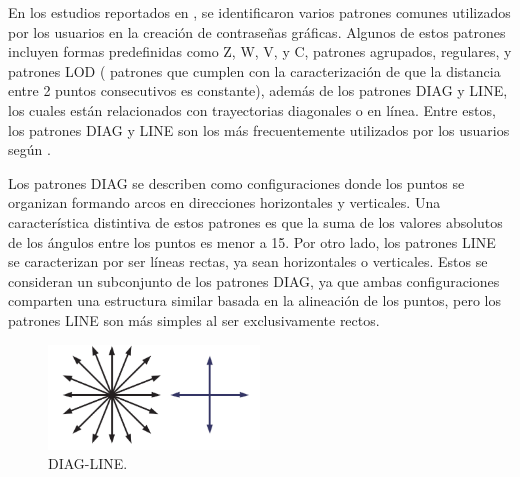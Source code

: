 \documentclass[12pt]{report}
\begin{document}
En los estudios reportados en \cite{5,20,21,22,23,24,25}, se identificaron varios patrones comunes utilizados por los usuarios en la creación de contraseñas gráficas. Algunos de estos patrones incluyen formas predefinidas como Z, W, V, y C, patrones agrupados, regulares, y patrones LOD ( patrones que cumplen con la caracterización de que la distancia entre 2 puntos consecutivos es constante), además de los patrones DIAG y LINE, los cuales están relacionados con trayectorias diagonales o en línea. Entre estos, los patrones DIAG y LINE son los más frecuentemente utilizados por los usuarios según \cite{5}.

Los patrones DIAG se describen como configuraciones donde los puntos se organizan formando arcos en direcciones horizontales y verticales. Una característica distintiva de estos patrones es que la suma de los valores absolutos de los ángulos entre los puntos es menor a 15\degree. Por otro lado, los patrones LINE se caracterizan por ser líneas rectas, ya sean horizontales o verticales. Estos se consideran un subconjunto de los patrones DIAG, ya que ambas configuraciones comparten una estructura similar basada en la alineación de los puntos, pero los patrones LINE son más simples al ser exclusivamente rectos.

\begin{figure}[ht]
	\centering
	\includegraphics[width=0.5\textwidth]{DIAG_LINE.png}
	\caption{DIAG-LINE.}
	\label{fig:DIAG_LINE}
\end{figure}


\end{document}
